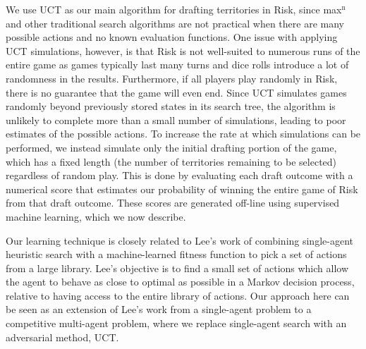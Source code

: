 \documentclass[letterpaper]{article}
\numberwithin{equation}{section}
\numberwithin{theorem}{section}
\numberwithin{lemma}{section}
\numberwithin{df}{section}
\begin{document}
We use UCT as our main algorithm for drafting territories in Risk, since max$^\text{n}$ and other traditional search algorithms are not practical when there are many possible actions and no known evaluation functions.  One issue with applying UCT simulations, however, is that Risk is not well-suited to numerous runs of the entire game as games typically last many turns and dice rolls introduce a lot of randomness in the results.  Furthermore, if all players play randomly in Risk, there is no guarantee that the game will even end.  Since UCT simulates games randomly beyond previously stored states in its search tree, the algorithm is unlikely to complete more than a small number of simulations, leading to poor estimates of the possible actions.  To increase the rate at which simulations can be performed, we instead simulate only the initial drafting portion of the game, which has a fixed length (the number of territories remaining to be selected) regardless of random play.  This is done by evaluating each draft outcome with a numerical score that estimates our probability of winning the entire game of Risk from that draft outcome.  These scores are generated off-line using supervised machine learning, which we now describe.
%

Our learning technique is closely related to Lee's work \cite{GregLeeThesis} of combining single-agent heuristic search with a machine-learned fitness function to pick a set of actions from a large library.  Lee's objective is to find a small set of actions which allow the agent to behave as close to optimal as possible in a Markov decision process, relative to having access to the entire library of actions.  Our approach here can be seen as an extension of Lee's work from a single-agent problem to a competitive multi-agent problem, where we replace single-agent search with an adversarial method, UCT. 
\end{document}
